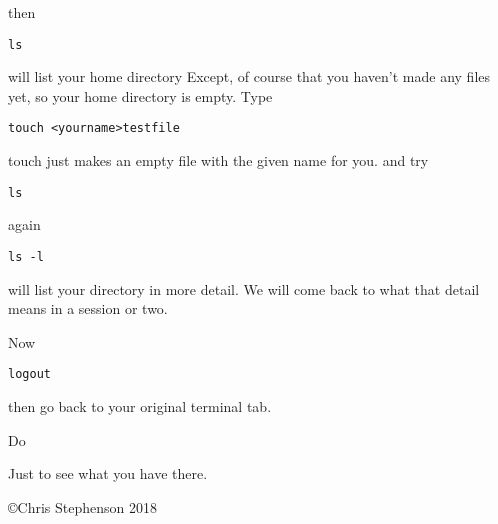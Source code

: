 \documentclass[12pt,a4paper]{article}
\begin{document}
then
\begin{lstlisting}
ls
\end{lstlisting}
will list your home directory
Except, of course that you haven’t made any files yet, so your home directory is empty. 
Type
\begin{lstlisting}
touch <yourname>testfile
\end{lstlisting}
touch just makes an empty file with the given name for you.
and try
\begin{lstlisting}
ls
\end{lstlisting}
again
\begin{lstlisting}
ls -l
\end{lstlisting}
will list your directory in more detail. We will come back to what that detail means in a session or two. 

Now 
\begin{lstlisting} 
logout
\end{lstlisting}

then go back to your original terminal tab.

Do 


Just to see what you have there.

\vspace{4cm}

\copyright Chris Stephenson 2018
\end{document}
